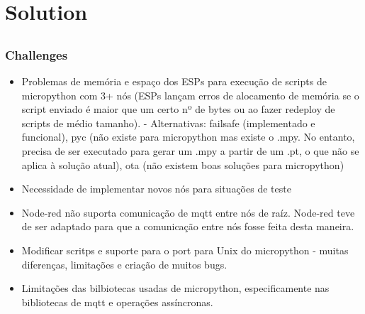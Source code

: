 \chapter{Solution} \label{chap:solution}

\section*{}

\subsection{Challenges}
\begin{itemize}
    \item Problemas de memória e espaço dos ESPs para execução de scripts de micropython com 3+ nós (ESPs lançam erros de alocamento de memória se o script enviado é maior que um certo nº de bytes ou ao fazer redeploy de scripts de médio tamanho). - Alternativas: failsafe (implementado e funcional), pyc (não existe para micropython mas existe o .mpy. No entanto, precisa de ser executado para gerar um .mpy a partir de um .pt, o que não se aplica à solução atual), ota (não existem boas soluções para micropython)
    \item Necessidade de implementar novos nós para situações de teste
    \item Node-red não suporta comunicação de mqtt entre nós de raíz. Node-red teve de ser adaptado para que a comunicação entre nós fosse feita desta maneira.
    \item Modificar scritps e suporte para o port para Unix do micropython - muitas diferenças, limitações e criação de muitos bugs.
    \item Limitações das bilbiotecas usadas de micropython, especificamente nas bibliotecas de mqtt e operações assíncronas.
\end{itemize}{}
